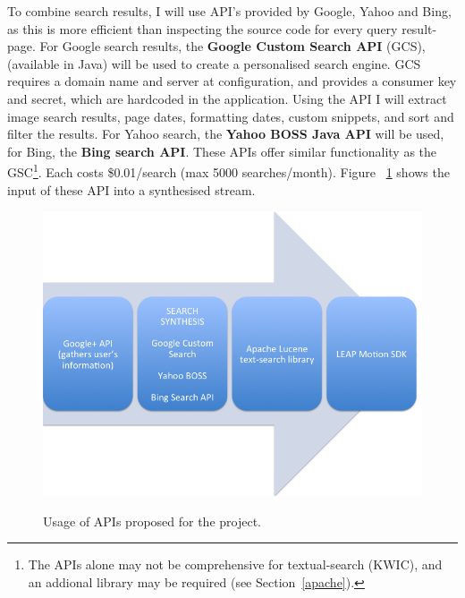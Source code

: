 \documentclass[a4paper, 11pt]{article}
\begin{document}
\begin{justify}
To combine search results, I will use API’s provided by Google, Yahoo and Bing, as this is more efficient than inspecting the source code for every query result-page. For Google search results, the \textbf{Google Custom Search API} (GCS), (available in Java) will be used to create a personalised search engine. GCS requires a domain name and server at configuration, and provides a consumer key and secret, which are hardcoded in the application. Using the API I will extract image search results, page dates, formatting dates, custom snippets, and sort and filter the results. For Yahoo search, the \textbf{Yahoo BOSS Java API} will be used, for Bing, the \textbf{Bing search API}. These APIs offer similar functionality as the GSC\footnote{The APIs alone may not be comprehensive for textual-search (KWIC), and an addional library may be required (see Section~\ref{apache}).}. Each costs \$0.01/search (max 5000 searches/month). Figure ~\ref{apistream} shows the input of these API into a synthesised stream.

\begin{figure}[H]
\begin{center}
\includegraphics[scale=0.3]{apistream}\\
\caption{Usage of APIs proposed for the project.}
\label{apistream}
\end{center}
\end{figure}


\end{justify}
\end{document}
